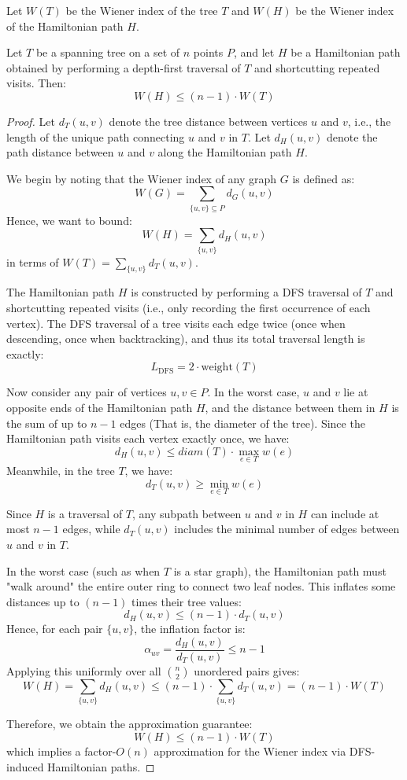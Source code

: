 \documentclass{article}
\begin{document}
Let $W(T)$ be the Wiener index of the tree $T$ and $W(H)$ be the Wiener index of the Hamiltonian path $H$.

\begin{theorem}
	Let $T$ be a spanning tree on a set of $n$ points $P$, and let $H$ be a Hamiltonian path obtained by performing a depth-first traversal of $T$ and shortcutting repeated visits. Then:
	\[
		W(H) \leq (n - 1) \cdot W(T)
	\]
\end{theorem}

\begin{proof}
	Let $d_T(u, v)$ denote the tree distance between vertices $u$ and $v$, i.e., the length of the unique path connecting $u$ and $v$ in $T$. Let $d_H(u, v)$ denote the path distance between $u$ and $v$ along the Hamiltonian path $H$.

	We begin by noting that the Wiener index of any graph $G$ is defined as:
	\[
		W(G) = \sum_{\{u,v\} \subseteq P} d_G(u,v)
	\]
	Hence, we want to bound:
	\[
		W(H) = \sum_{\{u,v\}} d_H(u,v)
	\]
	in terms of $W(T) = \sum_{\{u,v\}} d_T(u,v)$.

	The Hamiltonian path $H$ is constructed by performing a DFS traversal of $T$ and shortcutting repeated visits (i.e., only recording the first occurrence of each vertex). The DFS traversal of a tree visits each edge twice (once when descending, once when backtracking), and thus its total traversal length is exactly:
	\[
		L_{\text{DFS}} = 2 \cdot \text{weight}(T)
	\]

	Now consider any pair of vertices $u,v \in P$. In the worst case, $u$ and $v$ lie at opposite ends of the Hamiltonian path $H$, and the distance between them in $H$ is the sum of up to $n-1$ edges (That is, the diameter of the tree). Since the Hamiltonian path visits each vertex exactly once, we have:
	\[
		d_H(u,v) \leq diam(T) \cdot \max_{e \in T} w(e)
	\]
	Meanwhile, in the tree $T$, we have:
	\[
		d_T(u,v) \geq \min_{e \in T} w(e)
	\]

	Since $H$ is a traversal of $T$, any subpath between $u$ and $v$ in $H$ can include at most $n - 1$ edges, while $d_T(u,v)$ includes the minimal number of edges between $u$ and $v$ in $T$.

	In the worst case (such as when $T$ is a star graph), the Hamiltonian path must "walk around" the entire outer ring to connect two leaf nodes. This inflates some distances up to $(n - 1)$ times their tree values:
	\[
		d_H(u, v) \leq (n - 1) \cdot d_T(u, v)
	\]
	Hence, for each pair $\{u,v\}$, the inflation factor is:
	\[
		\alpha_{uv} = \frac{d_H(u, v)}{d_T(u, v)} \leq n - 1
	\]
	Applying this uniformly over all $\binom{n}{2}$ unordered pairs gives:
	\[
		W(H) = \sum_{\{u,v\}} d_H(u,v) \leq (n - 1) \cdot \sum_{\{u,v\}} d_T(u,v) = (n - 1) \cdot W(T)
	\]

	Therefore, we obtain the approximation guarantee:
	\[
		W(H) \leq (n - 1) \cdot W(T)
	\]
	which implies a factor-$O(n)$ approximation for the Wiener index via DFS-induced Hamiltonian paths.
\end{proof}
\end{document}
